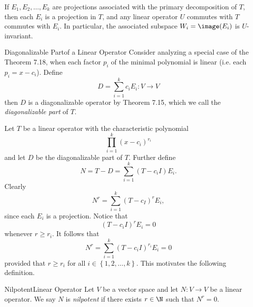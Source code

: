 \documentclass[linearalgebra]{subfiles}
\begin{document}
    \begin{cor}{}
        If $E_1, E_2, \ldots, E_k$ are projections associated with the primary decomposition of $T$, then each $E_i$ is a projection in $T$, and any linear operator $U$ commutes with $T$ commutes with $E_i$. In particular, the associated subspace $W_i = \image(E_i)$ is $U$-invariant.
    \end{cor}	

    \begin{definition}{Diagonalizable Part}{of a Linear Operator}
        Consider analyzing a special case of the Theorem 7.18, when each factor $p_i$ of the minimal polynomial is linear (i.e. each $p_i = x-c_i$). Define
        \begin{equation*}
            D = \sum^{k}_{i=1} c_iE_i:V\to V
        \end{equation*}
        then $D$ is a diagonalizable operator by Theorem 7.15, which we call the \emph{diagonalizable part} of $T$.
    \end{definition}

    \begin{remark}
        Let $T$ be a linear operator with the characteristic polynomial
        \begin{equation*}
            \prod^{k}_{i=1} (x-c_i)^{r_i}
        \end{equation*}
        and let $D$ be the diagonalizable part of $T$. Further define
        \begin{equation*}
            N = T - D = \sum^{k}_{i=1} (T-c_iI)E_i.
        \end{equation*}
        Clearly
        \begin{equation*}
            N^r = \sum^{k}_{i=1} (T-c_I)^rE_i,
        \end{equation*}
        since each $E_i$ is a projection. Notice that
        \begin{equation*}
            (T-c_iI)^rE_i = 0
        \end{equation*}
        whenever $r\geq r_i$. It follows that
        \begin{equation*}
            N^r = \sum^{k}_{i=1} \left( T-c_iI \right) ^{r_i} E_i = 0 
        \end{equation*}
        provided that $r\geq r_i$ for all $i\in \left\lbrace 1, 2, \ldots, k \right\rbrace$. This motivates the following definition.
    \end{remark}

    \begin{definition}{Nilpotent}{Linear Operator}
        Let $V$ be a vector space and let $N:V\to V$ be a linear operator. We say $N$ is \emph{nilpotent} if there exists $r\in \N$ such that $N^r = 0$. 
    \end{definition}
\end{document}
